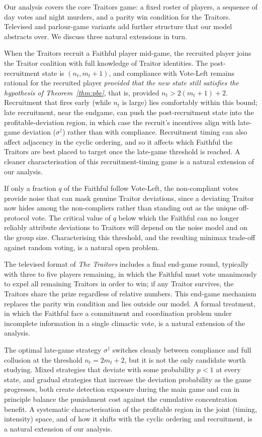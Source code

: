\documentclass[11pt,a4paper]{article}
\begin{document}
Our analysis covers the core Traitors game: a fixed roster of players, a
sequence of day votes and night murders, and a parity win condition for
the Traitors. Televised and parlour-game variants add further structure
that our model abstracts over. We discuss three natural extensions in
turn.

When the Traitors recruit a Faithful player mid-game, the recruited
player joins the Traitor coalition with full knowledge of Traitor
identities. The post-recruitment state is \((n_t, m_t + 1)\), and
compliance with Vote-Left remains rational for the recruited player
\emph{provided that the new state still satisfies the hypothesis of
Theorem~\ref{thm:pbe}}, that is, provided \(n_t > 2(m_t + 1) + 2\). Recruitment that fires early
(while \(n_t\) is large) lies comfortably within this bound; late
recruitment, near the endgame, can push the post-recruitment state into
the profitable-deviation region, in which case the recruit's incentives
align with late-game deviation (\(\sigma^\dagger\)) rather than with
compliance. Recruitment timing can also affect adjacency in the cyclic
ordering, and so it affects which Faithful the Traitors are best placed
to target once the late-game threshold is reached. A cleaner
characterisation of this recruitment-timing game is a natural extension
of our analysis.

If only a fraction \(q\) of the Faithful follow Vote-Left, the
non-compliant votes provide noise that can mask genuine Traitor
deviations, since a deviating Traitor now hides among the non-compliers
rather than standing out as the unique off-protocol vote. The critical
value of \(q\) below which the Faithful can no longer reliably attribute
deviations to Traitors will depend on the noise model and on the group
size. Characterising this threshold, and the resulting minimax
trade-off against random voting, is a natural open problem.

The televised format of \emph{The Traitors} includes a final end-game
round, typically with three to five players remaining, in which the
Faithful must vote unanimously to expel all remaining Traitors in order
to win; if any Traitor survives, the Traitors share the prize regardless
of relative numbers. This end-game mechanism replaces the parity win
condition and lies outside our model. A formal treatment, in which the
Faithful face a commitment and coordination problem under incomplete
information in a single climactic vote, is a natural extension of the
analysis.

The optimal late-game strategy \(\sigma^\dagger\) switches cleanly
between compliance and full collusion at the threshold \(n_t = 2m_t + 2\),
but it is not the only candidate worth studying. Mixed strategies that
deviate with some probability \(p < 1\) at every state, and gradual
strategies that increase the deviation probability as the game
progresses, both create detection exposure during the main game and can
in principle balance the punishment cost against the cumulative
concentration benefit. A systematic characterisation of the profitable
region in the joint (timing, intensity) space, and of how it shifts
with the cyclic ordering and recruitment, is a natural extension of our
analysis.
\end{document}
